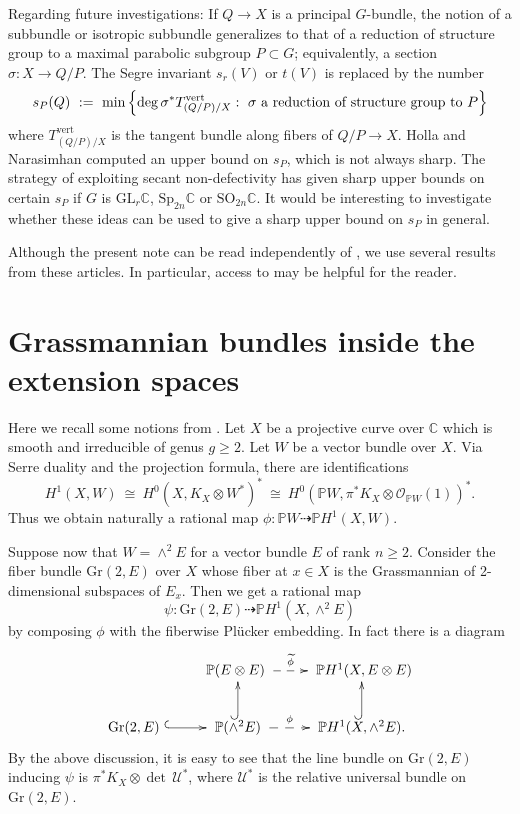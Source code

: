 \documentclass[10pt]{amsart}
\numberwithin{equation}{section}
\newcommand{\pp}{\mathbb P}
\newcommand{\cc}{\mathbb C}
\newcommand{\Kx}{K_X}
\newcommand{\U}{\mathcal U}
\newcommand{\Gr}{\mathrm{Gr}}
\begin{document}
Regarding future investigations: If $Q \to X$ is a principal $G$-bundle, the notion of a subbundle or isotropic subbundle generalizes to that of a reduction of structure group to a maximal parabolic subgroup $P \subset G$; equivalently, a section $\sigma \colon X \to Q/P$. The Segre invariant $s_r(V)$ or $t(V)$ is replaced by the number
\[ s_P(Q) \ := \ \min \left\{ \deg \sigma^* T^\mathrm{vert}_{(Q/P)/X} : \hbox{ $\sigma$ a reduction of structure group to $P$} \right\} \]
where $T^\mathrm{vert}_{(Q/P)/X}$ is the tangent bundle along fibers of $Q/P \to X$. Holla and Narasimhan \cite{HN} computed an upper bound on $s_P$, which is not always sharp. The strategy of exploiting secant non-defectivity has given sharp upper bounds on certain $s_P$ if $G$ is $\mathrm{GL}_r \cc$, $\mathrm{Sp}_{2n} \cc$ or $\mathrm{SO}_{2n} \cc$. It would be interesting to investigate whether these ideas can be used to give a sharp upper bound on $s_P$ in general.

Although the present note can be read independently of \cite{CH1, CH2, CH3, CH4}, we use several results from these articles. In particular, access to \cite[\S 2 and \S 5]{CH3} may be helpful for the reader.

\section{Grassmannian bundles inside the extension spaces}

Here we recall some notions from \cite{CH2, CH3}. Let $X$ be a projective curve over $\cc$ which is smooth and irreducible of genus $g \ge 2$. Let $W$ be a vector bundle over $X$. Via Serre duality and the projection formula, there are identifications
\[ H^1 (X, W) \ \cong \ H^0 (X, \Kx \otimes W^*)^* \ \cong %
\ H^0 \left( \pp W, \pi^* \Kx \otimes {\mathcal O}_{\pp W}(1) \right)^*. \]
Thus we obtain naturally a rational map $\phi \colon \pp W \dashrightarrow \pp H^1 (X, W)$.

Suppose now that $W = \wedge^2 E$ for a vector bundle $E$ of rank $n \ge 2$. Consider the fiber bundle $\Gr(2, E)$ over $X$ whose fiber at $x \in X$ is the Grassmannian of 2-dimensional subspaces of $E_x$. Then we get a rational map
\[
\psi \colon \Gr(2,E) \dashrightarrow \pp H^{1}(X, \wedge^{2} E)
\]
by composing $\phi$ with the fiberwise Pl\"ucker embedding. In fact there is a diagram
\begin{equation}
\xymatrix{    & \pp(E \otimes E) \ \ar@{-->}^-{\widetilde{\phi}}[r] & \ \pp H^1(X, E \otimes E)   \\
   \Gr(2, E) \ \ar@{^{(}->}[r]  & \ \pp (\wedge^2 E) \ \ar@{-->}[r]^-\phi \ar@{^{(}->}[u] & \ \pp H^1(X, \wedge^2 E) . \ \ar@{^{(}->}[u]  } \label{extensions}
 \end{equation}
By the above discussion, it is easy to see that the line bundle on $\Gr(2, E)$ inducing $\psi$ is $\pi^* \Kx \otimes \det\, \U^*$, where $\U^*$ is the relative universal bundle on $\Gr(2, E)$.
\end{document}
